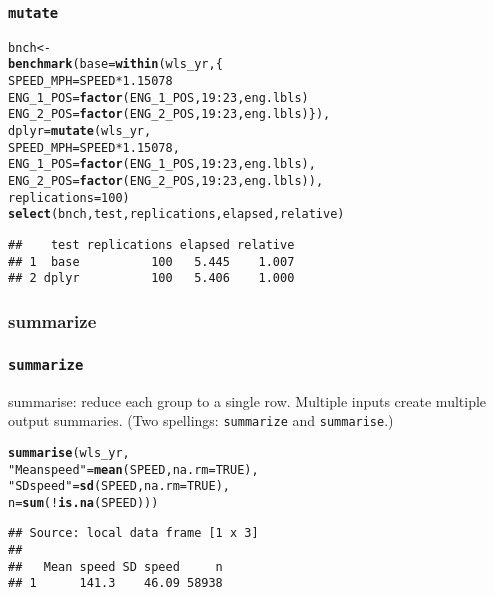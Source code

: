 \documentclass{beamer}\usepackage[]{graphicx}\usepackage[]{color}
\makeatletter
\newcommand{\hlnum}[1]{\textcolor[rgb]{0.686,0.059,0.569}{#1}}%
\newcommand{\hlstr}[1]{\textcolor[rgb]{0.192,0.494,0.8}{#1}}%
\newcommand{\hlopt}[1]{\textcolor[rgb]{0,0,0}{#1}}%
\newcommand{\hlstd}[1]{\textcolor[rgb]{0.345,0.345,0.345}{#1}}%
\newcommand{\hlkwb}[1]{\textcolor[rgb]{0.69,0.353,0.396}{#1}}%
\newcommand{\hlkwc}[1]{\textcolor[rgb]{0.333,0.667,0.333}{#1}}%
\newcommand{\hlkwd}[1]{\textcolor[rgb]{0.737,0.353,0.396}{\textbf{#1}}}%
\newenvironment{kframe}{%
 \def\at@end@of@kframe{}%
 \ifinner\ifhmode%
  \def\at@end@of@kframe{\end{minipage}}%
  \begin{minipage}{\columnwidth}%
 \fi\fi%
 \def\FrameCommand##1{\hskip\@totalleftmargin \hskip-\fboxsep
 \colorbox{shadecolor}{##1}\hskip-\fboxsep
     \hskip-\linewidth \hskip-\@totalleftmargin \hskip\columnwidth}%
 \MakeFramed {\advance\hsize-\width
   \@totalleftmargin\z@ \linewidth\hsize
   \@setminipage}}%
 {\par\unskip\endMakeFramed%
 \at@end@of@kframe}
\newenvironment{knitrout}{}{} %
\makeatother
\begin{document}
\begin{frame}[fragile]
  \frametitle{{\tt mutate}}
\begin{knitrout}\footnotesize
{}\color{fgcolor}\begin{kframe}
\begin{alltt}
\hlstd{bnch} \hlkwb{<-}
\hlkwd{benchmark}\hlstd{(}\hlkwc{base} \hlstd{=} \hlkwd{within}\hlstd{(wls_yr, \{}
                        \hlstd{SPEED_MPH} \hlkwb{=} \hlstd{SPEED} \hlopt{*} \hlnum{1.15078}
                        \hlstd{ENG_1_POS} \hlkwb{=} \hlkwd{factor}\hlstd{(ENG_1_POS,} \hlnum{19}\hlopt{:}\hlnum{23}\hlstd{, eng.lbls)}
                        \hlstd{ENG_2_POS} \hlkwb{=} \hlkwd{factor}\hlstd{(ENG_2_POS,} \hlnum{19}\hlopt{:}\hlnum{23}\hlstd{, eng.lbls)\}),}
          \hlkwc{dplyr} \hlstd{=} \hlkwd{mutate}\hlstd{(wls_yr,}
                         \hlkwc{SPEED_MPH} \hlstd{= SPEED} \hlopt{*} \hlnum{1.15078}\hlstd{,}
                         \hlkwc{ENG_1_POS} \hlstd{=} \hlkwd{factor}\hlstd{(ENG_1_POS,} \hlnum{19}\hlopt{:}\hlnum{23}\hlstd{, eng.lbls),}
                         \hlkwc{ENG_2_POS} \hlstd{=} \hlkwd{factor}\hlstd{(ENG_2_POS,} \hlnum{19}\hlopt{:}\hlnum{23}\hlstd{, eng.lbls)),}
          \hlkwc{replications} \hlstd{=} \hlnum{100}\hlstd{)}
\hlkwd{select}\hlstd{(bnch, test, replications, elapsed, relative)}
\end{alltt}
\begin{verbatim}
##    test replications elapsed relative
## 1  base          100   5.445    1.007
## 2 dplyr          100   5.406    1.000
\end{verbatim}
\end{kframe}
\end{knitrout}
\end{frame} 

\subsubsection{summarize}%
\begin{frame}[fragile]
  \frametitle{{\tt summarize}}
summarise: reduce each group to a single row. Multiple
inputs create multiple output summaries.  (Two spellings:
{\tt summarize} and {\tt summarise}.)
\begin{knitrout}\footnotesize
{}\color{fgcolor}\begin{kframe}
\begin{alltt}
\hlkwd{summarise}\hlstd{(wls_yr,}
          \hlstr{"Mean speed"} \hlstd{=} \hlkwd{mean}\hlstd{(SPEED,} \hlkwc{na.rm} \hlstd{=} \hlnum{TRUE}\hlstd{),}
          \hlstr{"SD speed"}   \hlstd{=} \hlkwd{sd}\hlstd{(SPEED,} \hlkwc{na.rm} \hlstd{=} \hlnum{TRUE}\hlstd{),}
          \hlkwc{n}            \hlstd{=} \hlkwd{sum}\hlstd{(}\hlopt{!}\hlkwd{is.na}\hlstd{(SPEED)))}
\end{alltt}
\begin{verbatim}
## Source: local data frame [1 x 3]
## 
##   Mean speed SD speed     n
## 1      141.3    46.09 58938
\end{verbatim}
\end{kframe}
\end{knitrout}
\end{frame} 
\end{document}
